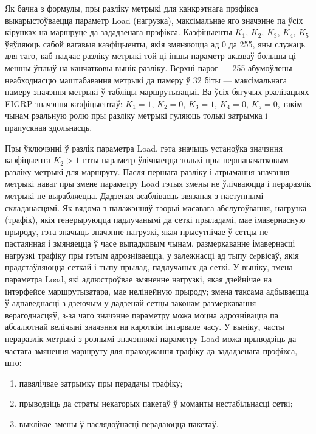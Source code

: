 Як бачна з формулы, пры разліку метрыкі для канкрэтнага прэфікса
выкарыстоўваецца параметр Load (нагрузка), максімальнае яго значэнне па ўсіх кірунках на маршруце да зададзенага прэфікса.
Каэфіцыенты $K_1$, $K_2$, $K_3$, $K_4$, $K_5$ ўяўляюць сабой вагавыя
каэфіцыенты, якія змяняюцца ад 0 да 255, яны служаць для таго, каб падчас разліку метрыкі
той ці іншы параметр аказваў большы ці меншы ўплыў на канчатковы
вынік разліку. Верхні парог --- 255 абумоўлены неабходнасцю маштабавання метрыкі да памеру ў 32 біты --- максімальнага памеру значэння
метрыкі ў табліцы маршрутызацыі. Ва ўсіх бягучых рэалізацыях EIGRP значэння
каэфіцыентаў: $K_1 = 1$, $K_2 = 0$, $K_3 = 1$, $K_4 = 0$, $K_5 = 0$, такім чынам рэальную ролю пры разліку
метрыкі гуляюць толькі затрымка і прапускная здольнасць.

Пры ўключэнні ў разлік параметра Load, гэта значыць устаноўка значэння
каэфіцыента $K_2 > 1$ гэты параметр ўлічваецца толькі пры першапачатковым
разліку метрыкі для маршруту. Пасля першага разліку і атрымання значэння
метрыкі нават пры змене параметру Load гэтыя змены не ўлічваюцца
і пераразлік метрыкі не вырабляецца. Дадзеная асаблівасць звязаная з наступнымі складанасцямі. Як вядома з палажэнняў тэорыі масавага абслугоўвання, нагрузка (трафік), якія генерыруюцца падлучанымі да сеткі прыладамі,
мае імавернасную прыроду, гэта значыць значэнне нагрузкі, якая прысутнічае ў сетцы
не пастаянная і змяняецца ў часе выпадковым чынам. размеркаванне імавернасці нагрузкі трафіку пры гэтым адрозніваецца, у залежнасці
ад тыпу сeрвісаў, якія прадстаўляюцца сеткай і тыпу прылад, падлучаных
да сеткі. У выніку, змена параметра Load, які адлюстроўвае змяненне
нагрузкі, якая дзейнічае на інтэрфейсе маршрутызатара, мае нелінейную
прыроду; змена таксама адбываецца ў адпаведнасці з дзеючым у дадзенай
сетцы законам размеркавання верагоднасцяў, з-за чаго значэнне параметру можа моцна адрознівацца па абсалютнай велічыні значэння на
кароткім інтэрвале часу. У выніку, часты пераразлік метрыкі з рознымі значэннямі параметру Load можа прыводзіць да частага
змянення маршруту для праходжання трафіку да зададзенага прэфікса, што:
\begin{enumerate}
    \item павялічвае затрымку пры перадачы трафіку;
    \item прыводзіць да страты некаторых пакетаў ў моманты нестабільнасці сеткі;
    \item выклікае змены ў паслядоўнасці перадаюцца пакетаў.
\end{enumerate}

